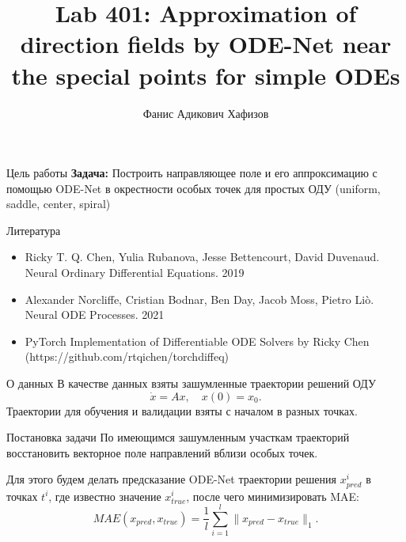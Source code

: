 \documentclass{beamer}
\title[\hbox to 56mm{Ускоренные безградиентные методы}]{Lab 401: Approximation of direction fields by ODE-Net near the special points for simple ODEs}
\author[Ф.\,А. Хафизов]{Фанис Адикович Хафизов}
\institute{Московский физико-технический институт}
\date{\footnotesize
\par\smallskip\emph{Курс:} Математические методы прогнозирования\par Группа Б05-105
\par\bigskip\small 2024}
\begin{document}
\begin{frame}
\thispagestyle{empty}
\maketitle
\end{frame}

\begin{frame}{Цель работы}
    \textbf{Задача:} Построить направляющее поле и его аппроксимацию с помощью ODE-Net в окрестности особых точек для простых ОДУ (uniform, saddle, center, spiral)
\end{frame}

\begin{frame}{Литература}

\begin{itemize}
 \item Ricky T. Q. Chen, Yulia Rubanova, Jesse Bettencourt, David Duvenaud. Neural Ordinary Differential Equations. 2019
 \item Alexander Norcliffe, Cristian Bodnar, Ben Day, Jacob Moss, Pietro Li{\`o}. Neural ODE Processes. 2021
 \item PyTorch Implementation of Differentiable ODE Solvers by Ricky Chen (https://github.com/rtqichen/torchdiffeq)
\end{itemize}

\end{frame}

\begin{frame}{О данных}
    В качестве данных взяты зашумленные траектории решений ОДУ
    $$ \dot{x} = A x, \quad x(0) = x_0. $$
    Траектории для обучения и валидации взяты с началом в разных точках.
\end{frame}

\begin{frame}{Постановка задачи}
    По имеющимся зашумленным участкам траекторий восстановить векторное поле направлений вблизи особых точек.

    Для этого будем делать предсказание ODE-Net траектории решения $x_{pred}^i$ в точках $t^i$, где известно значение $x_{true}^i$, после чего минимизировать MAE:
    $$MAE(x_{pred}, x_{true}) = \frac{1}{l}\sum\limits_{i = 1}^l \|x_{pred} - x_{true}\|_1.$$
\end{frame}
\end{document}
